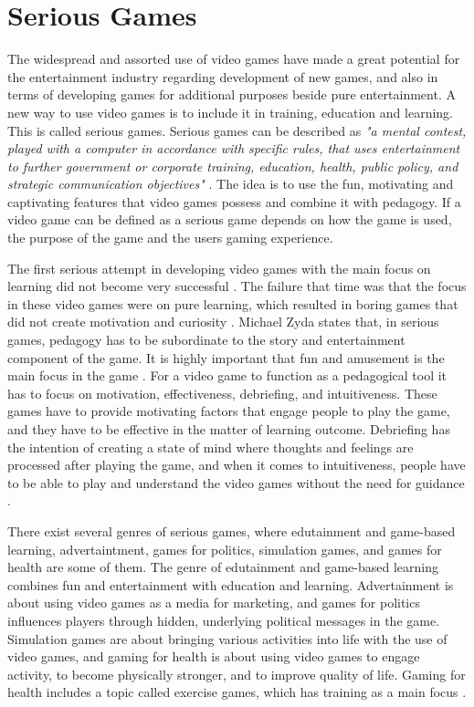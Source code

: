 \section{Serious Games}
\label{sec:sergames}
The widespread and assorted use of video games have made a great potential for the entertainment industry regarding development of new games, and also in terms of developing games for additional purposes beside pure entertainment. A new way to use video games is to include it in training, education and learning. This is called serious games. Serious games can be described as \emph{"a mental contest, played with a computer in accordance with specific rules, that uses entertainment to further government or corporate training, education, health, public policy, and strategic communication objectives"} \cite{zyda2005visual}. The idea is to use the fun, motivating and captivating features that video games possess and combine it with pedagogy. If a video game can be defined as a serious game depends on how the game is used, the purpose of the game and the users gaming experience. 

The first serious attempt in developing video games with the main focus on learning did not become very successful \cite{understandingvg}. The failure that time was that the focus in these  video games were on pure learning, which resulted in boring games that did not create motivation and curiosity \cite{understandingvg} \cite{susi2007serious}. Michael Zyda states that, in serious games, pedagogy has to be subordinate to the story and entertainment component of the game. It is highly important that fun and amusement is the main focus in the game \cite{zyda2005visual}. For a video game to function as a pedagogical tool it has to focus on motivation, effectiveness, debriefing, and intuitiveness. These games have to provide motivating factors that engage people to play the game, and they have to be effective in the matter of learning outcome. Debriefing has the intention of creating a state of mind where thoughts and feelings are processed after playing the game, and when it comes to intuitiveness, people have to be able to play and understand the video games without the need for guidance \cite{understandingvg}. 

There exist several genres of serious games, where edutainment and game-based learning, advertaintment, games for politics, simulation games, and games for health are some of them. The genre of edutainment and game-based learning combines fun and entertainment with education and learning. Advertainment is about using video games as a media for marketing, and games for politics influences players through hidden, underlying political messages in the game. Simulation games are about bringing various activities into life with the use of video games, and gaming for health is about using video games to engage activity, to become physically stronger, and to improve quality of life. Gaming for health includes a topic called exercise games, which has training as a main focus \cite{understandingvg} \cite{alfingewang}.

